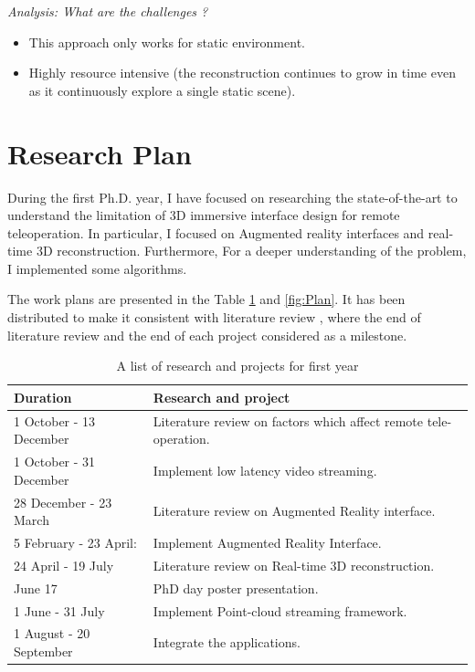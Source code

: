 \textit{Analysis: What are the challenges ?}
\begin{itemize}
    \item This approach only works for static environment.
    \item Highly resource intensive (the reconstruction continues to grow in time even as it continuously explore a
single static scene).
\end{itemize}

\section{Research Plan}

During the first Ph.D. year, I have focused on researching the state-of-the-art to understand the limitation of 3D immersive interface design for remote teleoperation. In particular, I focused on Augmented reality interfaces and real-time 3D reconstruction. Furthermore, For a deeper understanding of the problem, I implemented some algorithms.

The work plans are presented in the Table \ref{table:plan} and \ref{fig:Plan}. It has been distributed to make it consistent with literature review , where the end of literature review and the end of each project considered as a milestone.

\begin{table}[ht] 
\begin{tabular}{ p{4.5cm} p{10cm}}
 \hline
 \rowcolor{lightgray}  Duration & Research and project \\
\hline

 1 October - 13 December &  Literature review on factors which affect remote tele-operation. \\

\rowcolor{lightgray} 1 October - 31 December &  Implement low latency video streaming. \\

 28 December - 23 March &  Literature review on Augmented Reality interface. \\

\rowcolor{lightgray} 5 February - 23 April: & Implement Augmented Reality Interface. \\

 24 April - 19 July & Literature review on Real-time 3D reconstruction. \\

\rowcolor{lightgray} June 17 &  PhD day poster presentation.\\

 1 June - 31 July & Implement Point-cloud streaming framework.\\
 
 \rowcolor{lightgray} 1 August - 20 September &  Integrate the applications.\\

\end{tabular}
\caption{A list of research and projects for first year}
\label{table:plan}
\end{table}

